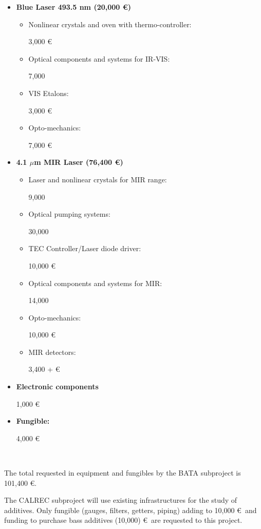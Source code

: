   \begin{itemize}
  \item \textbf{Blue Laser 493.5  nm  (20,000 \euro)}
  \begin{itemize}
\item Nonlinear crystals and oven with thermo-controller: {\raggedright 3,000 \euro } 
\item Optical components and systems for IR-VIS:  {\raggedright 7,000} 
\item VIS Etalons:  {\raggedright  3,000 \euro} 
\item Opto-mechanics:{ \raggedright 7,000  \euro} 
\end{itemize}

\item \textbf{4.1 $\mu$m MIR Laser (76,400 \euro)}
 \begin{itemize}
 \item Laser and nonlinear crystals for MIR range: { \raggedright  9,000 } 
\item Optical pumping systems: {\raggedright  30,000 } 
\item TEC Controller/Laser diode driver: {\raggedright   10,000  \euro} 
\item Optical components and systems for MIR: { \raggedright 14,000 }
\item Opto-mechanics: { \raggedright   10,000  \euro} 
\item MIR detectors:       {\raggedright  3,400 + \euro}
\end{itemize}
\item \textbf{Electronic components}                                                                                      {\bf \raggedright  1,000  \euro} 
\item \textbf{Fungible:}   {\bf \raggedright   4,000  \euro} \\
\end{itemize}

The total requested in equipment and fungibles by the BATA subproject is 101,400 \euro.

The CALREC subproject will use existing infrastructures for the study of additives. Only fungible (gauges, filters, getters, piping) adding to 10,000 \euro\ and funding to purchase bass additives (10,000) \euro\ are requested to this project. 